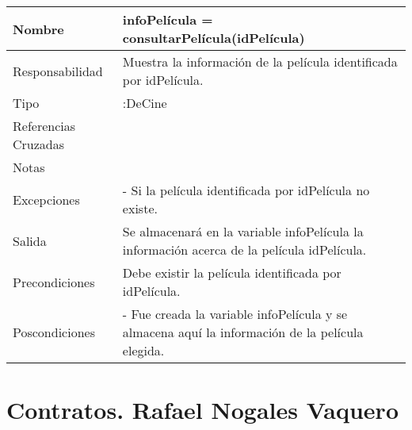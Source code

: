 \documentclass{article}
\begin{document}
\begin{table}[h]
\begin{tabular}{|l|l|l|l|l|l|}
\hline
\multicolumn{2}{|p{3cm}|}{Nombre} & \multicolumn{3}{p{8cm}|}{\textbf{infoPelícula = consultarPelícula(idPelícula)}}\\
\hline
\multicolumn{2}{|p{3cm}|}{Responsabilidad} & \multicolumn{4}{p{8cm}|}{Muestra la información de la película identificada por idPelícula.} \\
\hline
\multicolumn{2}{|p{3cm}|}{Tipo} & \multicolumn{4}{p{8cm}|}{:DeCine} \\
\hline
\multicolumn{2}{|p{3cm}|}{Referencias Cruzadas} & \multicolumn{4}{p{8cm}|}{} \\
\hline
\multicolumn{2}{|p{3cm}|}{Notas} & \multicolumn{4}{p{8cm}|}{} \\
\hline
\multicolumn{2}{|p{3cm}|}{Excepciones} & \multicolumn{4}{p{8cm}|}{-	Si la película identificada por idPelícula no existe.} \\
\hline
\multicolumn{2}{|p{3cm}|}{Salida} & \multicolumn{4}{p{8cm}|}{Se almacenará en la variable infoPelícula la información acerca de la película idPelícula.} \\
\hline
\multicolumn{2}{|p{3cm}|}{Precondiciones} & \multicolumn{4}{p{8cm}|}{Debe existir la película identificada por idPelícula.} \\
\hline
\multicolumn{2}{|p{3cm}|}{Poscondiciones} & \multicolumn{4}{p{8cm}|}{- Fue creada la variable infoPelícula y se almacena aquí la información de la película elegida.} \\
\hline
\end{tabular}
\end{table}
\clearpage
\section{Contratos. Rafael Nogales Vaquero}
\end{document}

